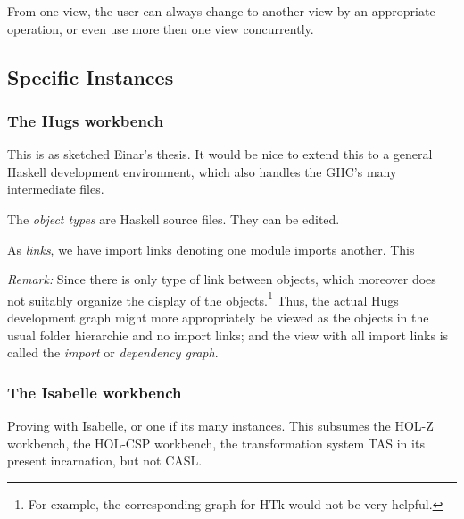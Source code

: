 \documentclass[a4paper]{article}
\begin{document}
From one view, the user can always change to another view by an
appropriate operation, or even use more then one view concurrently.

\subsection{Specific Instances}

\subsubsection{The Hugs workbench}

This is as sketched Einar's thesis. It would be nice to extend this to
a general Haskell development environment, which also handles the
GHC's many intermediate files.

The \emph{object types} are Haskell source files. They can be edited. 

As \emph{links}, we have import links denoting one module imports
another. This 

\emph{Remark:} Since there is only type of link between objects, which
moreover does not suitably organize the display of the
objects.\footnote{For example, the corresponding graph for HTk would
  not be very helpful.} Thus, the actual Hugs development graph might
more appropriately be viewed as the objects in the usual folder
hierarchie and no import links; and the view with all import links is
called the \emph{import} or \emph{dependency graph}.

\subsubsection{The Isabelle workbench}

Proving with Isabelle, or one if its many instances. This subsumes the
HOL-Z workbench, the HOL-CSP workbench, the transformation system TAS
in its present incarnation, but not CASL.
\end{document}
